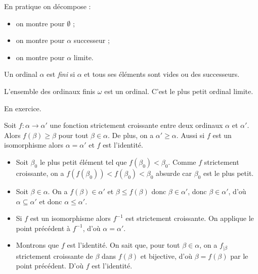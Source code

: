 \documentclass[./main]{subfiles}
\begin{document}
  \begin{rmk}
    En pratique on décompose :
    \begin{itemize}
      \item on montre pour $\emptyset$ ;
      \item on montre pour $\alpha$ successeur ;
      \item on montre pour $\alpha$ limite.
    \end{itemize}
  \end{rmk}

  \begin{defn}
    Un ordinal $\alpha$ est \textit{fini} si $\alpha$ et tous ses éléments sont vides ou des successeurs.
  \end{defn}

  \begin{prop}
    L'ensemble des ordinaux finis $\omega$ est un ordinal. C'est le plus petit ordinal limite.
  \end{prop}
  \begin{prv}
    En exercice.
  \end{prv}

  \begin{lem}
    Soit $f : \alpha \to \alpha'$ une fonction strictement croissante entre deux ordinaux $\alpha$ et $\alpha'$.
    Alors $f(\beta) \ge \beta$ pour tout $\beta \in \alpha$.
    De plus, on a $\alpha' \ge \alpha$.
    Aussi si $f$ est un isomorphisme alors $\alpha = \alpha'$ et  $f$ est l'identité.
  \end{lem}

  \begin{prv}
    \begin{itemize}
      \item Soit $\beta_0$ le plus petit élément tel que $f(\beta_0) < \beta_0$.
        Comme $f$ strictement croissante, on a $f(f(\beta_0)) < f(\beta_0) < \beta_0$ absurde car $\beta_0$ est le plus petit.
      \item Soit $\beta \in \alpha$. On a $f(\beta) \in \alpha'$ et $\beta \le f(\beta)$ donc $\beta \in \alpha'$, donc $\beta \in \alpha'$, d'où $\alpha \subseteq \alpha'$ et donc $\alpha \le \alpha'$.
      \item Si $f$ est un isomorphisme alors $f^{-1}$ est strictement croissante.
        On applique le point précédent à $f^{-1}$, d'où $\alpha = \alpha'$.
      \item Montrons que $f$ est l'identité.
        On sait que, pour tout $\beta \in \alpha$, on a $f_{|\beta}$ strictement croissante de $\beta$ dans $f(\beta)$ et bijective, d'où $\beta = f(\beta)$ par le point précédent.
        D'où $f$ est l'identité.
    \end{itemize}
  \end{prv}
\end{document}

